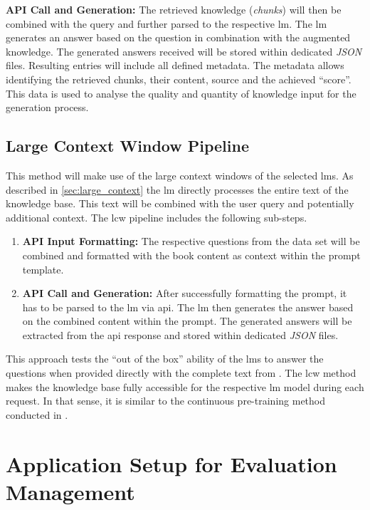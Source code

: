 \noindent\textbf{API Call and Generation:}\newline
    The retrieved knowledge (\textit{chunks}) will then be combined with the query and further parsed to the respective \ac{lm}.
    The \ac{lm} generates an answer based on the question in combination with the augmented knowledge.
    The generated answers received will be stored within dedicated \textit{JSON} files.
    Resulting entries will include all defined metadata.
    The metadata allows identifying the retrieved chunks, their content, source and the achieved \enquote{score}.
    This data is used to analyse the quality and quantity of knowledge input for the generation process. 
%
\subsection{Large Context Window Pipeline}\label{subsec:large_context_api_pipeline}
%
    This method will make use of the large context windows of the selected \acp{lm}.
    As described in \cref{sec:large_context} the \ac{lm} directly processes the entire text of the knowledge base.
    This text will be combined with the user query and potentially additional context.
    The \ac{lcw} pipeline includes the following sub-steps. 
    \begin{enumerate}
        \item \textbf{API Input Formatting:}
            The respective questions from the data set will be combined and formatted with the book content as context within the prompt template.  
        \item \textbf{API Call and Generation:}
            After successfully formatting the prompt, it has to be parsed to the \ac{lm} via \ac{api}.
            The \ac{lm} then generates the answer based on the combined content within the prompt.
            The generated answers will be extracted from the \ac{api} response and stored within dedicated \textit{JSON} files. 
    \end{enumerate}
    This approach tests the \enquote{out of the box} ability of the \acp{lm} to answer the questions when provided directly with the complete text from \citet{bb2}.
    The \ac{lcw} method makes the knowledge base fully accessible for the respective \ac{lm} model during each request.
    In that sense, it is similar to the continuous pre-training method conducted in \citet{Paul_Keller}.
%
\section[Evaluation Management]{Application Setup for Evaluation Management}\label{sec:framework_design}

